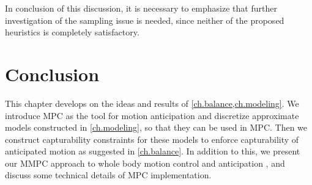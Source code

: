 In conclusion of this discussion, it is necessary to emphasize that further
investigation of the sampling issue is needed, since neither of the proposed
heuristics is completely satisfactory.



\section{Conclusion}

This chapter develops on the ideas and results of
\cref{ch.balance,ch.modeling}. We introduce \acf{MPC} as the tool for motion
anticipation and discretize approximate models constructed in
\cref{ch.modeling}, so that they can be used in \ac{MPC}. Then we construct
capturability constraints for these models to enforce capturability of
anticipated motion as suggested in \cref{ch.balance}. In addition to this, we
present our \acf{MMPC} approach to whole body motion control and anticipation
\cite{Sherikov2014humanoids, Sherikov2015humanoids}, and discuss some technical
details of \ac{MPC} implementation.
